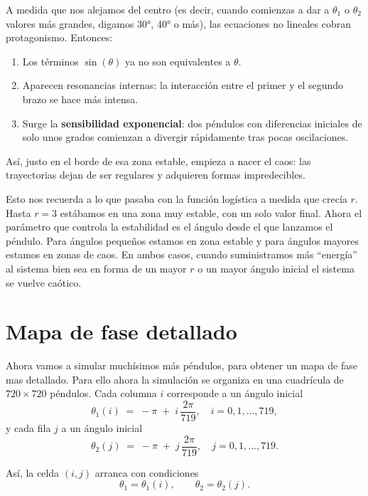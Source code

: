 \documentclass[
  10pt,
  a4paper,
  DIV=11,
  numbers=noendperiod,
  open=any]{scrreprt}
\providecommand{\tightlist}{%
  \setlength{\itemsep}{0pt}\setlength{\parskip}{0pt}}
\numberwithin{equation}{chapter}
\numberwithin{equation}{section}
\renewcommand{\[}{\begin{equation}}
\renewcommand{\]}{\end{equation}}
\begin{document}
A medida que nos alejamos del centro (es decir, cuando comienzas a dar a
\(\theta_1\) o \(\theta_2\) valores más grandes, digamos 30°, 40° o
más), las ecuaciones no lineales cobran protagonismo. Entonces:

\begin{enumerate}
\def\labelenumi{\arabic{enumi}.}
\tightlist
\item
  Los términos \(\sin(\theta)\) ya no son equivalentes a \(\theta\).\\
\item
  Aparecen resonancias internas: la interacción entre el primer y el
  segundo brazo se hace más intensa.\\
\item
  Surge la \textbf{sensibilidad exponencial}: dos péndulos con
  diferencias iniciales de solo unos grados comienzan a divergir
  rápidamente tras pocas oscilaciones.
\end{enumerate}

Así, justo en el borde de esa zona estable, empieza a nacer el caos: las
trayectorias dejan de ser regulares y adquieren formas impredecibles.

Esto nos recuerda a lo que pasaba con la función logística a medida que
crecía \(r\). Hasta \(r=3\) estábamos en una zona muy estable, con un
solo valor final. Ahora el parámetro que controla la estabilidad es el
ángulo desde el que lanzamos el péndulo. Para ángulos pequeños estamos
en zona estable y para ángulos mayores estamos en zonas de caos. En
ambos casos, cuando suministramos más ``energía'' al sistema bien sea en
forma de un mayor \(r\) o un mayor ángulo inicial el sistema se vuelve
caótico.

\section{Mapa de fase detallado}\label{mapa-de-fase-detallado}

Ahora vamos a simular muchísimos más péndulos, para obtener un mapa de
fase mas detallado. Para ello ahora la simulación se organiza en una
cuadrícula de \(720 \times 720\) péndulos. Cada columna \(i\)
corresponde a un ángulo inicial \[
\theta_1(i) \;=\; -\pi \;+\; i\,\frac{2\pi}{719}, 
\quad i = 0,1,\dots,719,
\] y cada fila \(j\) a un ángulo inicial \[
\theta_2(j) \;=\; -\pi \;+\; j\,\frac{2\pi}{719}, 
\quad j = 0,1,\dots,719.
\]

Así, la celda \((i,j)\) arranca con condiciones \[
\theta_1 = \theta_1(i), 
\qquad
\theta_2 = \theta_2(j).
\]
\end{document}
